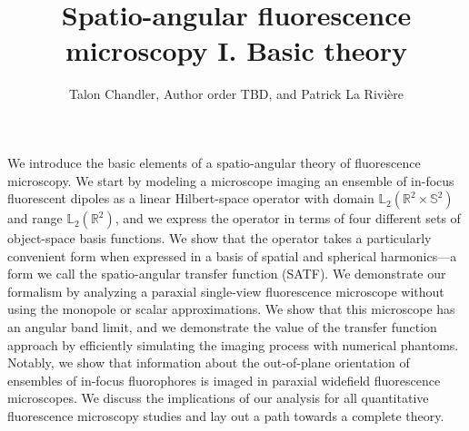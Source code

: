 \documentclass{osa-article}
\providecommand{\mbb}[1]{\mathbb{#1}}
\begin{document}
\title{Spatio-angular fluorescence microscopy I. Basic theory}

\author{Talon Chandler, Author order TBD, and Patrick La Rivi\`ere }

\address{University of Chicago, Department of Radiology, Chicago, Illinois 60637, USA\\
Publications Department, The Optical Society, 2010 Massachusetts Avenue NW, Washington, DC 20036, USA\\
Currently with the Department of Electronic Journals, The Optical Society, 2010 Massachusetts Avenue NW, Washington, DC 20036, USA}




\begin{abstract*}
  We introduce the basic elements of a spatio-angular theory of fluorescence
  microscopy. We start by modeling a microscope imaging an ensemble of in-focus
  fluorescent dipoles as a linear Hilbert-space operator with domain
  $\mbb{L}_2(\mbb{R}^2\times\mbb{S}^2)$ and range $\mbb{L}_2(\mbb{R}^2)$, and we
  express the operator in terms of four different sets of object-space basis
  functions. We show that the operator takes a particularly convenient form when
  expressed in a basis of spatial and spherical harmonics---a form we call the
  spatio-angular transfer function (SATF). We demonstrate our formalism by
  analyzing a paraxial single-view fluorescence microscope without using the
  monopole or scalar approximations. We show that this microscope has an angular
  band limit, and we demonstrate the value of the transfer function approach by
  efficiently simulating the imaging process with numerical phantoms. Notably,
  we show that information about the out-of-plane orientation of ensembles of
  in-focus fluorophores is imaged in paraxial widefield fluorescence
  microscopes. We discuss the implications of our analysis for all quantitative
  fluorescence microscopy studies and lay out a path towards a complete theory.
\end{abstract*}
\end{document}
